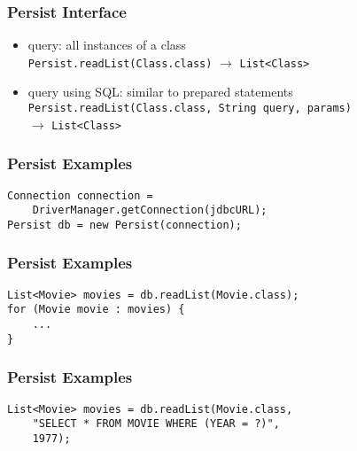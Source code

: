 \documentclass[dvipsnames]{beamer}
\theoremstyle{plain}
\begin{document}
\begin{frame}
  \frametitle{Persist Interface}

  \begin{itemize}
    \item query: all instances of a class\\
      \lstinline!Persist.readList(Class.class)!
       $\rightarrow$ \lstinline!List<Class>!
    \item query using SQL: similar to prepared statements\\
      \lstinline!Persist.readList(Class.class, String query, params)!\\
       $\rightarrow$ \lstinline!List<Class>!
  \end{itemize}
\end{frame}

\begin{frame}[fragile]
  \frametitle{Persist Examples}

  \begin{example}
    \begin{lstlisting}
Connection connection =
    DriverManager.getConnection(jdbcURL);
Persist db = new Persist(connection);
    \end{lstlisting}
  \end{example}
\end{frame}

\begin{frame}[fragile]
  \frametitle{Persist Examples}

  \begin{example}
    \begin{lstlisting}
List<Movie> movies = db.readList(Movie.class);
for (Movie movie : movies) {
    ...
}
    \end{lstlisting}
  \end{example}
\end{frame}

\begin{frame}[fragile]
  \frametitle{Persist Examples}

  \begin{example}
    \begin{lstlisting}
List<Movie> movies = db.readList(Movie.class,
    "SELECT * FROM MOVIE WHERE (YEAR = ?)",
    1977);
    \end{lstlisting}
  \end{example}
\end{frame}
\end{document}
